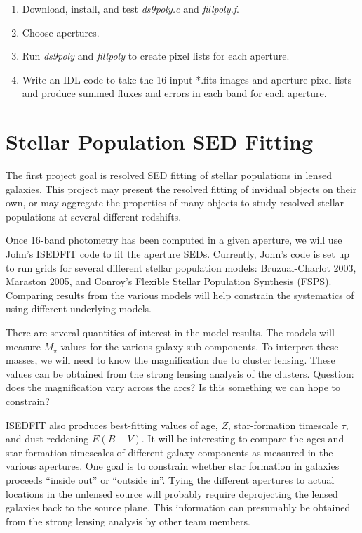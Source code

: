 \documentclass[preprint,12pt]{aastex}
\begin{document}
\vspace{-0.1in}
\begin{enumerate}\itemsep-6pt
\item {Download, install, and test {\it{ds9poly.c}} and
  {\it{fillpoly.f}}.}
\item {Choose apertures.}
\item {Run {\it{ds9poly}} and {\it{fillpoly}} to create pixel lists
  for each aperture.}
\item {Write an IDL code to take the 16 input *.fits images and
  aperture pixel lists and produce summed fluxes and errors in each
  band for each aperture.}
\end{enumerate}



\section{Stellar Population SED Fitting}\label{SED_fit}

The first project goal is resolved SED fitting of stellar populations
in lensed galaxies.  This project may present the resolved fitting of
invidual objects on their own, or may aggregate the properties of many
objects to study resolved stellar populations at several different
redshifts.  

Once 16-band photometry has been computed in a given aperture, we will
use John's ISEDFIT code to fit the aperture SEDs.  Currently, John's
code is set up to run grids for several different stellar population
models: Bruzual-Charlot 2003, Maraston 2005, and Conroy's Flexible
Stellar Population Synthesis (FSPS).  Comparing results from the
various models will help constrain the systematics of using different
underlying models.  

There are several quantities of interest in the model results.  The
models will measure $M_{\star}$ values for the various galaxy
sub-components.  To interpret these masses, we will need to know the
magnification due to cluster lensing.  These values can be obtained
from the strong lensing analysis of the clusters.  Question: does the
magnification vary across the arcs?  Is this something we can hope to
constrain?  

ISEDFIT also produces best-fitting values of age, $Z$, star-formation
timescale $\tau$, and dust reddening $E(B-V)$.  It will be interesting
to compare the ages and star-formation timescales of different galaxy
components as measured in the various apertures.  One goal is to
constrain whether star formation in galaxies proceeds ``inside out''
or ``outside in''.  Tying the different apertures to actual locations
in the unlensed source will probably require deprojecting the lensed
galaxies back to the source plane.  This information can presumably be
obtained from the strong lensing analysis by other team members.
\end{document}
